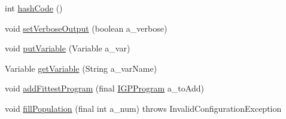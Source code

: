 \begin{DoxyCompactItemize}
\item 
int \hyperlink{classorg_1_1jgap_1_1gp_1_1impl_1_1_g_p_genotype_a9b8cb5e7395359743bbee7658be90a36}{hash\-Code} ()
\item 
void \hyperlink{classorg_1_1jgap_1_1gp_1_1impl_1_1_g_p_genotype_a2cda11ec40667a6cb061a4c87ace0b6c}{set\-Verbose\-Output} (boolean a\-\_\-verbose)
\item 
void \hyperlink{classorg_1_1jgap_1_1gp_1_1impl_1_1_g_p_genotype_a0b615fba7524275eb09b3d7929d73329}{put\-Variable} (Variable a\-\_\-var)
\item 
Variable \hyperlink{classorg_1_1jgap_1_1gp_1_1impl_1_1_g_p_genotype_a66770c2d4fb9645f33afec5dc37bb47c}{get\-Variable} (String a\-\_\-var\-Name)
\item 
void \hyperlink{classorg_1_1jgap_1_1gp_1_1impl_1_1_g_p_genotype_a8ada3482e8689629778fe77164afb271}{add\-Fittest\-Program} (final \hyperlink{interfaceorg_1_1jgap_1_1gp_1_1_i_g_p_program}{I\-G\-P\-Program} a\-\_\-to\-Add)
\item 
void \hyperlink{classorg_1_1jgap_1_1gp_1_1impl_1_1_g_p_genotype_a4327e7a69fcbcfe051e00e46c933ea7a}{fill\-Population} (final int a\-\_\-num)  throws Invalid\-Configuration\-Exception 
\end{DoxyCompactItemize}
